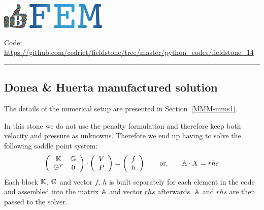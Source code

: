 \includegraphics[height=1.25cm]{images/pictograms/benchmark}
\includegraphics[height=1.25cm]{images/pictograms/FEM}




\begin{center}
\inpython
{\small Code: \url{https://github.com/cedrict/fieldstone/tree/master/python_codes/fieldstone_14}}
\end{center}

\par\noindent\rule{\textwidth}{0.4pt}

\subsection*{Donea \& Huerta manufactured solution}

The details of the numerical setup are presented in Section~\ref{MMM-mms1}.

In this stone we do not use the penalty formulation and therefore 
keep both velocity and pressure as unknowns. Therefore we end up having to solve 
the following saddle point system:
\[
\left(
\begin{array}{cc}
{\mathbb{K}} & {\mathbb{G}} \\ {\mathbb{G}}^T & 0 
\end{array}
\right)
\cdot
\left(
\begin{array}{c}
V \\ P
\end{array}
\right)
=
\left(
\begin{array}{c}
 f \\ h
\end{array}
\right)
\quad\quad
{\rm or,}
\quad\quad
{\mathbb{A}} \cdot X = rhs
\]
Each block ${\mathbb{K}}$, ${\mathbb{G}}$ and vector $f$, $h$ is built separately for each element 
in the code and assembled into 
the matrix ${\mathbb{A}}$ and vector $rhs$ afterwards. ${\mathbb{A}}$ and $rhs$ are then passed to the solver. 

